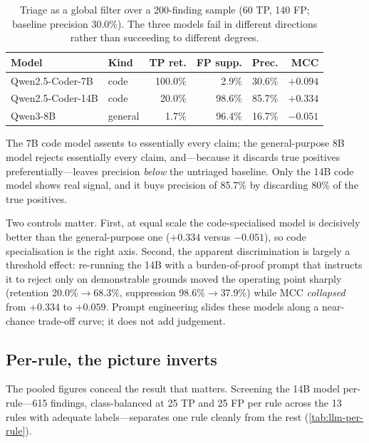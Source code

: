 \begin{table}[t]
\centering
\small
\caption{Triage as a global filter over a 200-finding sample (60 TP,
140 FP; baseline precision 30.0\%).  The three models fail in different
directions rather than succeeding to different degrees.}
\label{tab:llm-global}
\begin{tabular}{llrrrr}
\hline
Model & Kind & TP ret. & FP supp. & Prec. & MCC \\
\hline
Qwen2.5-Coder-7B  & code    & 100.0\% & 2.9\%  & 30.6\% & $+0.094$ \\
Qwen2.5-Coder-14B & code    & 20.0\%  & 98.6\% & 85.7\% & $+0.334$ \\
Qwen3-8B          & general & 1.7\%   & 96.4\% & 16.7\% & $-0.051$ \\
\hline
\end{tabular}
\end{table}

The 7B code model assents to essentially every
claim; the general-purpose 8B model rejects essentially every claim,
and---because it discards true positives preferentially---leaves
precision \emph{below} the untriaged baseline.  Only the 14B code model
shows real signal, and it buys precision of 85.7\% by discarding 80\%
of the true positives.

Two controls matter.  First, at equal scale the code-specialised model
is decisively better than the general-purpose one ($+0.334$ versus
$-0.051$), so code specialisation is the right axis.  Second, the
apparent discrimination is largely a threshold effect: re-running the
14B with a burden-of-proof prompt that instructs it to reject only on
demonstrable grounds moved the operating point sharply (retention
20.0\%$\rightarrow$68.3\%, suppression 98.6\%$\rightarrow$37.9\%) while
MCC \emph{collapsed} from $+0.334$ to $+0.059$.  Prompt engineering
slides these models along a near-chance trade-off curve; it does not
add judgement.

\subsection{Per-rule, the picture inverts}

The pooled figures conceal the result that matters.  Screening the 14B
model per-rule---615 findings, class-balanced at 25 TP and 25 FP per
rule across the 13 rules with adequate labels---separates one rule
cleanly from the rest (\cref{tab:llm-per-rule}).

